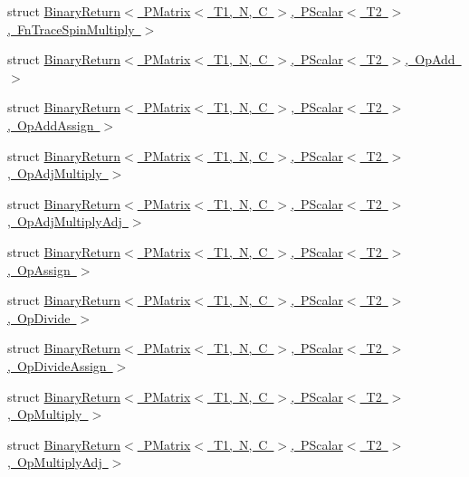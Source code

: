 \begin{DoxyCompactItemize}
\item 
struct \mbox{\hyperlink{structENSEM_1_1BinaryReturn_3_01PMatrix_3_01T1_00_01N_00_01C_01_4_00_01PScalar_3_01T2_01_4_00_01FnTraceSpinMultiply_01_4}{Binary\+Return$<$ P\+Matrix$<$ T1, N, C $>$, P\+Scalar$<$ T2 $>$, Fn\+Trace\+Spin\+Multiply $>$}}
\item 
struct \mbox{\hyperlink{structENSEM_1_1BinaryReturn_3_01PMatrix_3_01T1_00_01N_00_01C_01_4_00_01PScalar_3_01T2_01_4_00_01OpAdd_01_4}{Binary\+Return$<$ P\+Matrix$<$ T1, N, C $>$, P\+Scalar$<$ T2 $>$, Op\+Add $>$}}
\item 
struct \mbox{\hyperlink{structENSEM_1_1BinaryReturn_3_01PMatrix_3_01T1_00_01N_00_01C_01_4_00_01PScalar_3_01T2_01_4_00_01OpAddAssign_01_4}{Binary\+Return$<$ P\+Matrix$<$ T1, N, C $>$, P\+Scalar$<$ T2 $>$, Op\+Add\+Assign $>$}}
\item 
struct \mbox{\hyperlink{structENSEM_1_1BinaryReturn_3_01PMatrix_3_01T1_00_01N_00_01C_01_4_00_01PScalar_3_01T2_01_4_00_01OpAdjMultiply_01_4}{Binary\+Return$<$ P\+Matrix$<$ T1, N, C $>$, P\+Scalar$<$ T2 $>$, Op\+Adj\+Multiply $>$}}
\item 
struct \mbox{\hyperlink{structENSEM_1_1BinaryReturn_3_01PMatrix_3_01T1_00_01N_00_01C_01_4_00_01PScalar_3_01T2_01_4_00_01OpAdjMultiplyAdj_01_4}{Binary\+Return$<$ P\+Matrix$<$ T1, N, C $>$, P\+Scalar$<$ T2 $>$, Op\+Adj\+Multiply\+Adj $>$}}
\item 
struct \mbox{\hyperlink{structENSEM_1_1BinaryReturn_3_01PMatrix_3_01T1_00_01N_00_01C_01_4_00_01PScalar_3_01T2_01_4_00_01OpAssign_01_4}{Binary\+Return$<$ P\+Matrix$<$ T1, N, C $>$, P\+Scalar$<$ T2 $>$, Op\+Assign $>$}}
\item 
struct \mbox{\hyperlink{structENSEM_1_1BinaryReturn_3_01PMatrix_3_01T1_00_01N_00_01C_01_4_00_01PScalar_3_01T2_01_4_00_01OpDivide_01_4}{Binary\+Return$<$ P\+Matrix$<$ T1, N, C $>$, P\+Scalar$<$ T2 $>$, Op\+Divide $>$}}
\item 
struct \mbox{\hyperlink{structENSEM_1_1BinaryReturn_3_01PMatrix_3_01T1_00_01N_00_01C_01_4_00_01PScalar_3_01T2_01_4_00_01OpDivideAssign_01_4}{Binary\+Return$<$ P\+Matrix$<$ T1, N, C $>$, P\+Scalar$<$ T2 $>$, Op\+Divide\+Assign $>$}}
\item 
struct \mbox{\hyperlink{structENSEM_1_1BinaryReturn_3_01PMatrix_3_01T1_00_01N_00_01C_01_4_00_01PScalar_3_01T2_01_4_00_01OpMultiply_01_4}{Binary\+Return$<$ P\+Matrix$<$ T1, N, C $>$, P\+Scalar$<$ T2 $>$, Op\+Multiply $>$}}
\item 
struct \mbox{\hyperlink{structENSEM_1_1BinaryReturn_3_01PMatrix_3_01T1_00_01N_00_01C_01_4_00_01PScalar_3_01T2_01_4_00_01OpMultiplyAdj_01_4}{Binary\+Return$<$ P\+Matrix$<$ T1, N, C $>$, P\+Scalar$<$ T2 $>$, Op\+Multiply\+Adj $>$}}

\end{DoxyCompactItemize}
